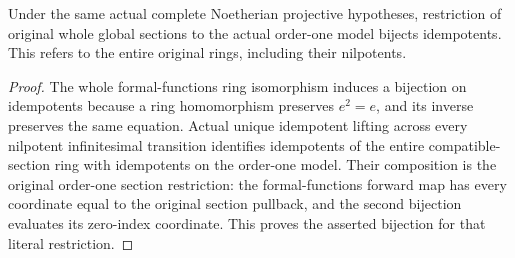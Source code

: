 \begin{theorem}
\label{thm:fibre-projective-formal-idempotents}
\leanok
Under the same actual complete Noetherian projective hypotheses,
restriction of original whole global sections to the actual order-one
model bijects idempotents. This refers to the entire original rings,
including their nilpotents.
\end{theorem}
\begin{proof}
The whole formal-functions ring isomorphism induces a bijection on
idempotents because a ring homomorphism preserves $e^2=e$, and its
inverse preserves the same equation. Actual unique idempotent lifting
across every nilpotent infinitesimal transition identifies idempotents
of the entire compatible-section ring with idempotents on the order-one
model. Their composition is the original order-one section restriction:
the formal-functions forward map has every coordinate equal to the
original section pullback, and the second bijection evaluates its
zero-index coordinate. This proves the asserted bijection for that
literal restriction.
\end{proof}
